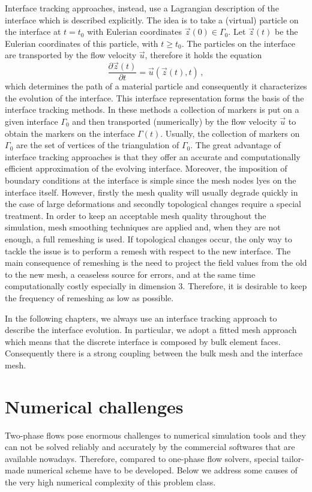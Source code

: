 Interface tracking approaches, instead, use a Lagrangian description of the
interface which is described explicitly. The idea is to take a (virtual)
particle on the interface at $t=t_0$ with Eulerian coordinates $\vec z(0) \in
\Gamma_0$. Let $\vec z(t)$ be the Eulerian coordinates of this particle, with
$t\geq t_0$. The particles on the interface are transported by the flow
velocity $\vec u$, therefore it holds the equation
\begin{equation}
\frac{\partial \vec z(t)}{\partial t}=\vec u(\vec z(t),t)\,,
\end{equation}
which determines the path of a material particle and consequently it
characterizes the evolution of the interface. This interface representation
forms the basis of the interface tracking methods. In these methods a
collection of markers is put on a given interface $\Gamma_0$ and then
transported (numerically) by the flow velocity $\vec u$ to obtain the markers
on the interface $\Gamma(t)$. Usually, the collection of markers on $\Gamma_0$
are the set of vertices of the triangulation of $\Gamma_0$. The great
advantage of interface tracking approaches is that they offer an accurate and
computationally efficient approximation of the evolving interface. Moreover,
the imposition of boundary conditions at the interface is simple since the mesh
nodes lyes on the interface itself. However, firstly the mesh quality will
usually degrade quickly in the case of large deformations and secondly
topological changes require a special treatment. In order to keep an
acceptable mesh quality throughout the simulation, mesh smoothing techniques
are applied and, when they are not enough,  a full remeshing is used. If
topological changes occur, the only way to tackle the issue is to
perform a remesh with respect to the new interface. The main consequence of
remeshing is the need to project the field values from the old to the new
mesh, a ceaseless source for errors, and at the same time computationally
costly especially in dimension 3. Therefore, it is desirable to keep the
frequency of remeshing as low as possible.

In the following chapters, we always use an interface tracking approach to
describe the interface evolution. In particular, we adopt a fitted mesh approach
which means that the discrete interface is composed by bulk element faces.
Consequently there is a strong coupling between the bulk mesh and the interface
mesh.

\section{Numerical challenges}\label{sec:numerical_challenges}
Two-phase flows pose enormous challenges to numerical simulation tools and
they can not be solved reliably and accurately by the commercial softwares that
are available nowadays. Therefore, compared to one-phase flow solvers, special
tailor-made numerical scheme have to be developed. Below we address some causes
of the very high numerical complexity of this problem class.

